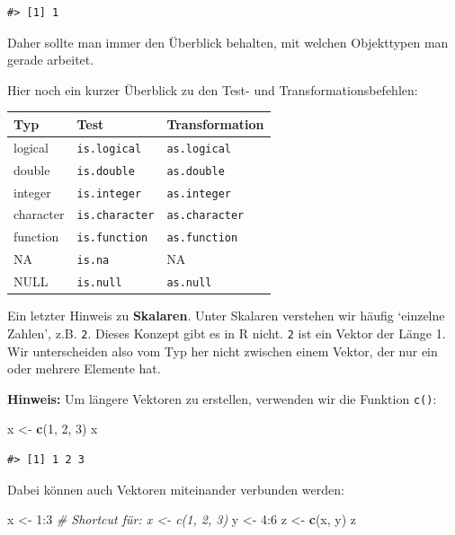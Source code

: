 \documentclass[]{tufte-book}
\newenvironment{Shaded}{}{}
\newcommand{\KeywordTok}[1]{\textcolor[rgb]{0.00,0.44,0.13}{\textbf{#1}}}
\newcommand{\DecValTok}[1]{\textcolor[rgb]{0.25,0.63,0.44}{#1}}
\newcommand{\StringTok}[1]{\textcolor[rgb]{0.25,0.44,0.63}{#1}}
\newcommand{\CommentTok}[1]{\textcolor[rgb]{0.38,0.63,0.69}{\textit{#1}}}
\newcommand{\OperatorTok}[1]{\textcolor[rgb]{0.40,0.40,0.40}{#1}}
\newcommand{\NormalTok}[1]{#1}
\begin{document}
\begin{verbatim}
#> [1] 1
\end{verbatim}

Daher sollte man immer den Überblick behalten, mit welchen Objekttypen
man gerade arbeitet.

Hier noch ein kurzer Überblick zu den Test- und Transformationsbefehlen:

\begin{longtable}[]{@{}lll@{}}
\toprule
Typ & Test & Transformation\tabularnewline
\midrule
\endhead
logical & \texttt{is.logical} & \texttt{as.logical}\tabularnewline
double & \texttt{is.double} & \texttt{as.double}\tabularnewline
integer & \texttt{is.integer} & \texttt{as.integer}\tabularnewline
character & \texttt{is.character} & \texttt{as.character}\tabularnewline
function & \texttt{is.function} & \texttt{as.function}\tabularnewline
NA & \texttt{is.na} & NA\tabularnewline
NULL & \texttt{is.null} & \texttt{as.null}\tabularnewline
\bottomrule
\end{longtable}

Ein letzter Hinweis zu \textbf{Skalaren}. Unter Skalaren verstehen wir
häufig `einzelne Zahlen', z.B. \texttt{2}. Dieses Konzept gibt es in R
nicht. \texttt{2} ist ein Vektor der Länge 1. Wir unterscheiden also vom
Typ her nicht zwischen einem Vektor, der nur ein oder mehrere Elemente
hat.

\textbf{Hinweis:} Um längere Vektoren zu erstellen, verwenden wir die
Funktion \texttt{c()}:

\begin{Shaded}
\begin{Highlighting}[]
\NormalTok{x <-}\StringTok{ }\KeywordTok{c}\NormalTok{(}\DecValTok{1}\NormalTok{, }\DecValTok{2}\NormalTok{, }\DecValTok{3}\NormalTok{)}
\NormalTok{x}
\end{Highlighting}
\end{Shaded}

\begin{verbatim}
#> [1] 1 2 3
\end{verbatim}

Dabei können auch Vektoren miteinander verbunden werden:

\begin{Shaded}
\begin{Highlighting}[]
\NormalTok{x <-}\StringTok{ }\DecValTok{1}\OperatorTok{:}\DecValTok{3}  \CommentTok{# Shortcut für: x <- c(1, 2, 3)}
\NormalTok{y <-}\StringTok{ }\DecValTok{4}\OperatorTok{:}\DecValTok{6}
\NormalTok{z <-}\StringTok{ }\KeywordTok{c}\NormalTok{(x, y)}
\NormalTok{z}
\end{Highlighting}
\end{Shaded}
\end{document}
